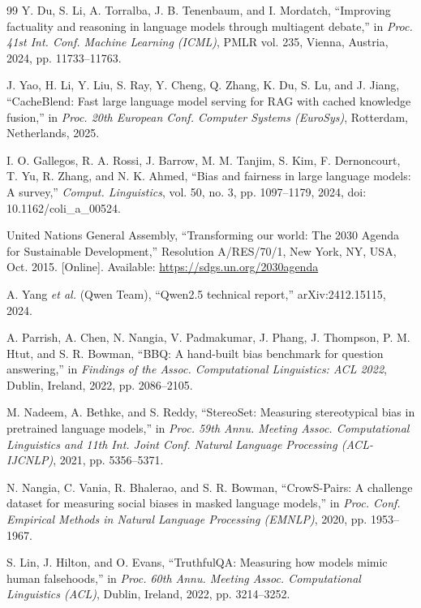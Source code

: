 \begin{thebibliography}{99}
Y. Du, S. Li, A. Torralba, J. B. Tenenbaum, and I. Mordatch,
``Improving factuality and reasoning in language models through multiagent debate,''
in \textit{Proc. 41st Int. Conf. Machine Learning (ICML)}, PMLR vol. 235,
Vienna, Austria, 2024, pp. 11733--11763.

J. Yao, H. Li, Y. Liu, S. Ray, Y. Cheng, Q. Zhang, K. Du, S. Lu, and J. Jiang,
``CacheBlend: Fast large language model serving for RAG with cached knowledge fusion,''
in \textit{Proc. 20th European Conf. Computer Systems (EuroSys)},
Rotterdam, Netherlands, 2025.

I. O. Gallegos, R. A. Rossi, J. Barrow, M. M. Tanjim, S. Kim, F. Dernoncourt, T. Yu, R. Zhang, and N. K. Ahmed,
``Bias and fairness in large language models: A survey,''
\textit{Comput. Linguistics}, vol. 50, no. 3, pp. 1097--1179, 2024,
doi: 10.1162/coli\_a\_00524.

United Nations General Assembly,
``Transforming our world: The 2030 Agenda for Sustainable Development,''
Resolution A/RES/70/1, New York, NY, USA, Oct. 2015.
[Online]. Available: \url{https://sdgs.un.org/2030agenda}

A. Yang \textit{et al.} (Qwen Team),
``Qwen2.5 technical report,''
arXiv:2412.15115, 2024.

A. Parrish, A. Chen, N. Nangia, V. Padmakumar, J. Phang, J. Thompson, P. M. Htut, and S. R. Bowman,
``BBQ: A hand-built bias benchmark for question answering,''
in \textit{Findings of the Assoc. Computational Linguistics: ACL 2022},
Dublin, Ireland, 2022, pp. 2086--2105.

M. Nadeem, A. Bethke, and S. Reddy,
``StereoSet: Measuring stereotypical bias in pretrained language models,''
in \textit{Proc. 59th Annu. Meeting Assoc. Computational Linguistics and 11th Int. Joint Conf. Natural Language Processing (ACL-IJCNLP)},
2021, pp. 5356--5371.

N. Nangia, C. Vania, R. Bhalerao, and S. R. Bowman,
``CrowS-Pairs: A challenge dataset for measuring social biases in masked language models,''
in \textit{Proc. Conf. Empirical Methods in Natural Language Processing (EMNLP)},
2020, pp. 1953--1967.

S. Lin, J. Hilton, and O. Evans,
``TruthfulQA: Measuring how models mimic human falsehoods,''
in \textit{Proc. 60th Annu. Meeting Assoc. Computational Linguistics (ACL)},
Dublin, Ireland, 2022, pp. 3214--3252.


\end{thebibliography}
